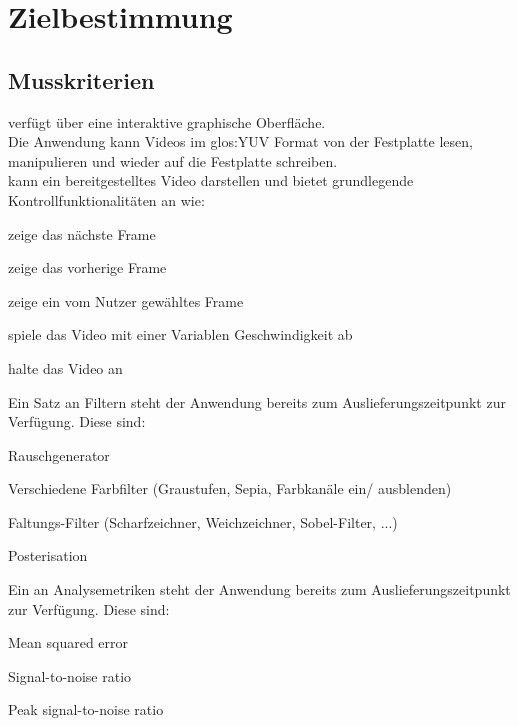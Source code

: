 \chapter{Zielbestimmung}

\section{Musskriterien}
\setcounter{counterKriterien}{0}
 \projektTitel verfügt über eine interaktive graphische Oberfläche.\\
 Die Anwendung kann Videos im \gls{glos:YUV} Format von der Festplatte lesen, manipulieren und wieder auf die Festplatte schreiben.\\
 \projektTitel kann ein bereitgestelltes Video darstellen und bietet grundlegende Kontrollfunktionalitäten an wie:
\begin{compactitem}
\item zeige das nächste Frame
\item zeige das vorherige Frame
\item zeige ein vom Nutzer gewähltes Frame
\item spiele das Video mit einer Variablen Geschwindigkeit ab
\item halte das Video an	
\end{compactitem} 
 Ein Satz an Filtern steht der Anwendung bereits zum Auslieferungszeitpunkt zur Verfügung. 
Diese sind:
\begin{compactitem}
\item Rauschgenerator
\item Verschiedene Farbfilter (Graustufen, Sepia, Farbkanäle ein/ ausblenden)
\item Faltungs-Filter (Scharfzeichner, Weichzeichner, Sobel-Filter, ...)
\item Posterisation
\end{compactitem}
 Ein an Analysemetriken steht der Anwendung bereits zum Auslieferungszeitpunkt zur Verfügung.
Diese sind:
\begin{compactitem}
\item Mean squared error
\item Signal-to-noise ratio
\item Peak signal-to-noise ratio
\end{compactitem}
